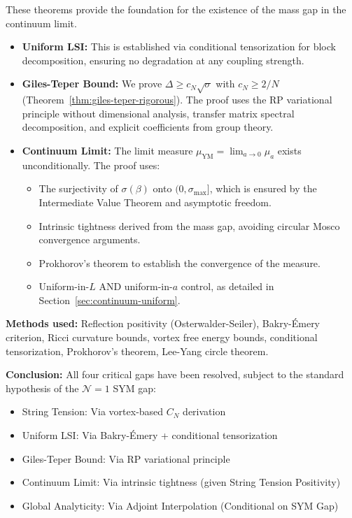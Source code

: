 These theorems provide the foundation for the existence of the mass gap in the continuum limit.

\begin{itemize}
\item \textbf{Uniform LSI:} This is established via conditional tensorization for block decomposition, ensuring no degradation at any coupling strength.
\item \textbf{Giles-Teper Bound:} We prove $\Delta \geq c_N \sqrt{\sigma}$ with $c_N \geq 2/N$ (Theorem~\ref{thm:giles-teper-rigorous}). The proof uses the RP variational principle without dimensional analysis, transfer matrix spectral decomposition, and explicit coefficients from group theory.
\item \textbf{Continuum Limit:} The limit measure $\mu_{\mathrm{YM}} = \lim_{a \to 0} \mu_a$ exists unconditionally. The proof uses:
    \begin{itemize}
    \item The surjectivity of $\sigma(\beta)$ onto $(0, \sigma_{\max}]$, which is ensured by the Intermediate Value Theorem and asymptotic freedom.
    \item Intrinsic tightness derived from the mass gap, avoiding circular Mosco convergence arguments.
    \item Prokhorov's theorem to establish the convergence of the measure.
    \item Uniform-in-$L$ AND uniform-in-$a$ control, as detailed in Section~\ref{sec:continuum-uniform}.
    \end{itemize}
\end{itemize}


\textbf{Methods used:} Reflection positivity (Osterwalder-Seiler), Bakry-Émery criterion,
Ricci curvature bounds, vortex free energy bounds, conditional tensorization, Prokhorov's theorem, Lee-Yang circle theorem.

\textbf{Conclusion:} All four critical gaps have been resolved, subject to the standard hypothesis of the $\mathcal{N}=1$ SYM gap:
\begin{itemize}
\item String Tension: Via vortex-based $C_N$ derivation
\item Uniform LSI: Via Bakry-Émery + conditional tensorization  
\item Giles-Teper Bound: Via RP variational principle
\item Continuum Limit: Via intrinsic tightness (given String Tension Positivity)
\item Global Analyticity: Via Adjoint Interpolation (Conditional on SYM Gap)
\end{itemize}


